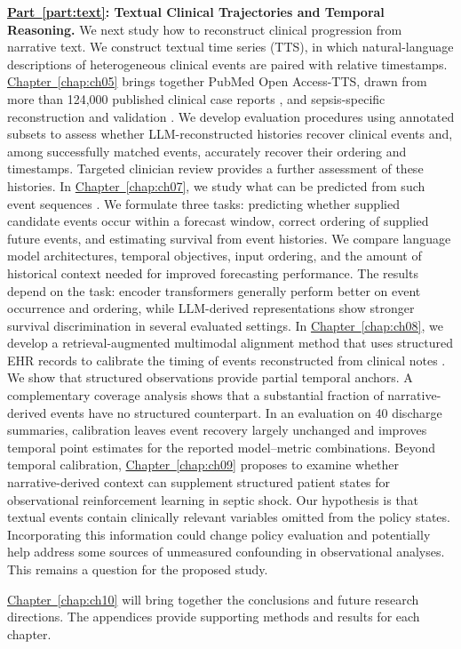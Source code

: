 \noindent\textbf{\hyperref[part:text]{Part~\ref*{part:text}}: Textual Clinical Trajectories and Temporal Reasoning.}
We next study how to reconstruct clinical progression from narrative text.
We construct textual time series (TTS), in which natural-language descriptions of heterogeneous clinical events are paired with relative timestamps.
\hyperref[chap:ch05]{Chapter~\ref*{chap:ch05}} brings together PubMed Open Access-TTS, drawn from more than 124,000 published clinical case reports \citep{noroozizadeh2025pmoa}, and sepsis-specific reconstruction and validation \citep{pmlr-v333-noroozizadeh26a}.
We develop evaluation procedures using annotated subsets to assess whether LLM-reconstructed histories recover clinical events and, among successfully matched events, accurately recover their ordering and timestamps.
Targeted clinician review provides a further assessment of these histories.
In \hyperref[chap:ch07]{Chapter~\ref*{chap:ch07}}, we study what can be predicted from such event sequences \citep{noroozizadeh2026forecasting}.
We formulate three tasks: predicting whether supplied candidate events occur within a forecast window, correct ordering of supplied future events, and estimating survival from event histories.
We compare language model architectures, temporal objectives, input ordering, and the amount of historical context needed for improved forecasting performance.
The results depend on the task: encoder transformers generally perform better on event occurrence and ordering, while LLM-derived representations show stronger survival discrimination in several evaluated settings.
In \hyperref[chap:ch08]{Chapter~\ref*{chap:ch08}}, we develop a retrieval-augmented multimodal alignment method that uses structured EHR records to calibrate the timing of events reconstructed from clinical notes \citep{kumar2026text}.
We show that structured observations provide partial temporal anchors.
A complementary coverage analysis shows that a substantial fraction of narrative-derived events have no structured counterpart.
In an evaluation on 40 discharge summaries, calibration leaves event recovery largely unchanged and improves temporal point estimates for the reported model–metric combinations.
Beyond temporal calibration, \hyperref[chap:ch09]{Chapter~\ref*{chap:ch09}} proposes to examine whether narrative-derived context can supplement structured patient states for observational reinforcement learning in septic shock.
Our hypothesis is that textual events contain clinically relevant variables omitted from the policy states.
Incorporating this information could change policy evaluation and potentially help address some sources of unmeasured confounding in observational analyses.
This remains a question for the proposed study.

\hyperref[chap:ch10]{Chapter~\ref*{chap:ch10}} will bring together the conclusions and future research directions.
The appendices provide supporting methods and results for each chapter.
